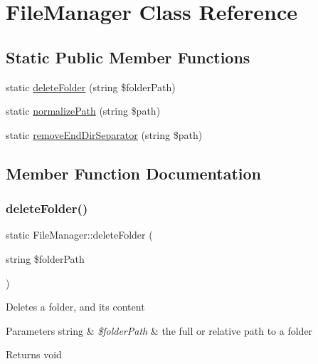 \hypertarget{classFileManager}{}\section{File\+Manager Class Reference}
\label{classFileManager}
\subsection*{Static Public Member Functions}
\begin{DoxyCompactItemize}
\item 
static \hyperlink{classFileManager_a19dfbed0b7597c61ccf94fa42abae688}{delete\+Folder} (string \$folder\+Path)
\item 
static \hyperlink{classFileManager_a455adf5b72c5068e606a1e1fdb67a97e}{normalize\+Path} (string \$path)
\item 
static \hyperlink{classFileManager_afe8493bc18be1fd7d7d431142c85008e}{remove\+End\+Dir\+Separator} (string \$path)
\end{DoxyCompactItemize}


\subsection{Member Function Documentation}
\mbox{\label{classFileManager_a19dfbed0b7597c61ccf94fa42abae688}} 
\subsubsection{\texorpdfstring{delete\+Folder()}{deleteFolder()}}
{\footnotesize\ttfamily static File\+Manager\+::delete\+Folder (\begin{DoxyParamCaption}\item[{string}]{\$folder\+Path }\end{DoxyParamCaption})\hspace{0.3cm}{\ttfamily [static]}}

Deletes a folder, and its content 
\begin{DoxyParams}[1]{Parameters}
string & {\em \$folder\+Path} & the full or relative path to a folder \\
\hline
\end{DoxyParams}
\begin{DoxyReturn}{Returns}
void 
\end{DoxyReturn}
\mbox{\label{classFileManager_a455adf5b72c5068e606a1e1fdb67a97e}} 
